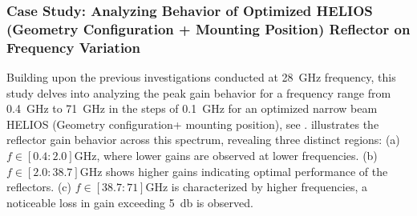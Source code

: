 \subsubsection{Case Study: Analyzing Behavior of Optimized HELIOS (Geometry Configuration + Mounting Position) Reflector on Frequency Variation}
Building upon the previous investigations conducted at \SI{28}{\giga\hertz} frequency, this study delves into analyzing the peak gain behavior for a frequency range from \SI{0.4}{\giga\hertz} to \SI{71}{\giga\hertz} in the steps of \SI{0.1}{\giga\hertz} for an optimized narrow beam HELIOS (Geometry configuration+ mounting position), see .  illustrates the reflector gain behavior across this spectrum, revealing three distinct regions: (a) $f\in [0.4:2.0] \si{\giga\hertz}$, where lower gains are observed at lower frequencies. (b) $f\in [2.0:38.7] \si{\giga\hertz}$ shows higher gains indicating optimal performance of the reflectors. (c) $f\in [38.7:71] \si{\giga\hertz}$ is characterized by higher frequencies, a noticeable loss in gain exceeding \SI{5}{\decibel} is observed.

